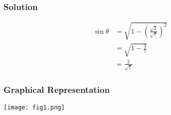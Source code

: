 \documentclass{beamer}
\begin{document}
\begin{frame}
\frametitle{Solution}

\begin{align}
\sin\theta &= \sqrt{1 - \left(\frac{\sqrt{3}}{\sqrt{7}}\right)^2} \\
&= \sqrt{1 - \frac{3}{7}} \\
&= \frac{2}{\sqrt{7}}
\end{align}

\end{frame}


\begin{frame}
\frametitle{Graphical Representation}
\begin{center}
\texttt{[image: fig1.png]}
\end{center}
\end{frame}
\end{document}
